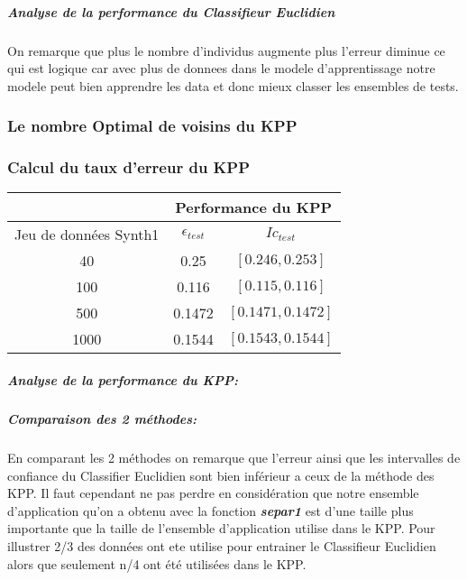 \documentclass[10pt]{article}
\begin{document}
			\subparagraph{Analyse de la performance du Classifieur Euclidien}
			On remarque que plus le nombre d'individus augmente plus l'erreur diminue ce qui est logique car avec plus de donnees dans le modele d'apprentissage notre modele peut bien apprendre les data et donc mieux classer les ensembles de tests.
			 
				\subsubsection{Le nombre Optimal de voisins du KPP }
			
				\subsubsection{Calcul du taux d'erreur du KPP }
		\begin{center}		
			\begin{tabular}{ | c | c | c |}
				\rowcolor{lightgray} 
				  &  \multicolumn{2}{|c|}{Performance du KPP}\\
				
				\hline
				Jeu de données Synth1 &   $\epsilon_{test}$ &  $Ic_{test}$\\
				\hline
				\multirow{1}{*}{40}       &0.25  & $[0.246, 0.253]$ 			 \\
				
				\hline
				\multirow{1}{*}{100}      & 0.116 	& $[0.115, 0.116]$  \\
				
				\hline
				\multirow{1}{*}{500}      &  0.1472  & 	$[0.1471, 0.1472]$	\\
				
				\hline
				\multirow{1}{*}{1000}      & 0.1544  & 	$[0.1543, 0.1544]$ 		\\
				
				\hline
			\end{tabular}
		\end{center}
	
	\subparagraph{Analyse de la performance du KPP: }
	
	
			
			\subparagraph{Comparaison des 2 méthodes: } 
			 En comparant les 2 méthodes on remarque que l'erreur ainsi que les intervalles de confiance du Classifier Euclidien sont bien inférieur a ceux de la méthode des KPP. Il faut cependant ne pas perdre en considération que notre ensemble d'application qu'on a obtenu avec la fonction \textbf{\textit{separ1}} est d'une taille plus importante que la taille de l'ensemble d'application utilise dans le KPP. Pour illustrer 2/3 des données ont ete utilise pour entrainer le Classifieur Euclidien alors que seulement n/4 ont été utilisées dans le KPP.
	
\end{document}
